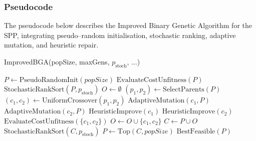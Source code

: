 \documentclass[12pt]{article}
\begin{document}
\subsubsection{Pseudocode}
The pseudocode below describes the Improved Binary Genetic Algorithm for the SPP, integrating pseudo–random initialisation, stochastic ranking, adaptive mutation, and heuristic repair.
\begin{algorithm}[htbp]
  \caption{ImprovedBGA(popSize, maxGens, \(p_{\mathrm{stoch}}\), ...)}
  \begin{algorithmic}[1]
    \State \(P \gets \text{PseudoRandomInit}(popSize)\) 
    \State \(\text{EvaluateCostUnfitness}(P)\) 
      \State \(\text{StochasticRankSort}(P, p_{\mathrm{stoch}})\) 
      \State \(O \gets \emptyset\) 
        \State \((p_1, p_2) \gets \text{SelectParents}(P)\) 
        \State \((c_1, c_2) \gets \text{UniformCrossover}(p_1, p_2)\) 
        \State \(\text{AdaptiveMutation}(c_1, P)\) 
        \State \(\text{AdaptiveMutation}(c_2, P)\) 
        \State \(\text{HeuristicImprove}(c_1)\) 
        \State \(\text{HeuristicImprove}(c_2)\) 
        \State \(\text{EvaluateCostUnfitness}(\{c_1, c_2\})\) 
        \State \(O \gets O \cup \{c_1, c_2\}\) 
      \EndWhile
      \State \(C \gets P \cup O\) 
      \State \(\text{StochasticRankSort}(C, p_{\mathrm{stoch}})\) 
      \State \(P \gets \text{Top}(C, popSize)\) 
    \EndFor
    \State \Return \(\text{BestFeasible}(P)\) 
  \end{algorithmic}
  \end{algorithm}
\end{document}
